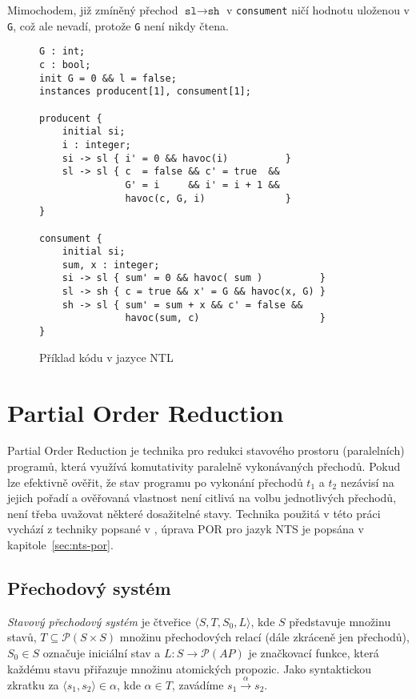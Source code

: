 \documentclass[12pt]{fithesis2}
\newcommand{\tuple}[1]{\langle #1 \rangle}
\begin{document}
Mimochodem, již zmíněný přechod $\texttt{sl} \rightarrow \texttt{sh}$ v \texttt{consument} ničí hodnotu uloženou v \texttt{G}, což ale nevadí, protože \texttt{G} není nikdy čtena.

\begin{figure}[t]
\begin{lstlisting}
G : int;
c : bool;
init G = 0 && l = false;
instances producent[1], consument[1];

producent {
    initial si;
    i : integer;
    si -> sl { i' = 0 && havoc(i)          }
    sl -> sl { c  = false && c' = true  &&
               G' = i     && i' = i + 1 &&
               havoc(c, G, i)              }
}

consument {
	initial si;
	sum, x : integer;
	si -> sl { sum' = 0 && havoc( sum )          }
	sl -> sh { c = true && x' = G && havoc(x, G) }
	sh -> sl { sum' = sum + x && c' = false &&
	           havoc(sum, c)                     }
}

\end{lstlisting}
\caption{Příklad kódu v jazyce NTL}
\label{fig:nts-prodcons}
\end{figure}

\section{Partial Order Reduction}
\label{sec:POR}
Partial Order Reduction je technika pro redukci stavového prostoru (paralelních) programů, která využívá komutativity paralelně vykonávaných přechodů. Pokud lze efektivně ověřit, že stav programu po vykonání přechodů $t_1$ a $t_2$ nezávisí na jejich pořadí a ověřovaná vlastnost není citlivá na volbu jednotlivých přechodů, není třeba uvažovat některé dosažitelné stavy. Technika použitá v této práci vychází z techniky popsané v \cite{CLARKE}, úprava POR pro jazyk NTS je popsána v kapitole~\ref{sec:nts-por}.

\subsection{Přechodový systém}
\textit{Stavový přechodový systém} je čtveřice $\tuple{S, T, S_0, L}$, kde $S$ představuje množinu stavů, $T \subseteq \mathcal{P}\left({S \times S}\right)$ množinu přechodových relací (dále zkráceně jen přechodů), $S_0 \in S$ označuje iniciální stav a $L : S \rightarrow \mathcal{P}\left({\mathit{AP}}\right)$ je značkovací funkce, která každému stavu přiřazuje množinu atomických propozic. Jako syntaktickou zkratku za $\tuple{s_1, s_2} \in \alpha$, kde $\alpha \in T$, zavádíme $s_1 \xrightarrow{\alpha} s_2$.
\end{document}
